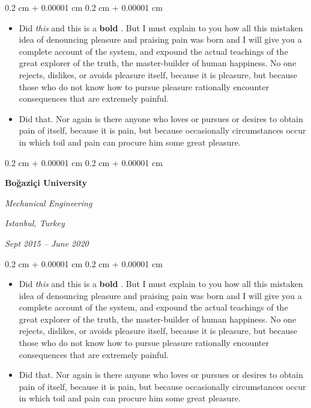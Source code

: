 \documentclass[10pt, letterpaper]{article}
\newenvironment{highlights}{
    \begin{itemize}[
        topsep=0.10 cm,
        parsep=0.10 cm,
        partopsep=0pt,
        itemsep=0pt,
        leftmargin=0.4 cm + 10pt
    ]
}{
    \end{itemize}
} %
\newenvironment{onecolentry}{
    \begin{adjustwidth}{
        0.2 cm + 0.00001 cm
    }{
        0.2 cm + 0.00001 cm
    }
}{
    \end{adjustwidth}
} %
\newenvironment{twocolentry}[2][]{
    \onecolentry
    \def\secondColumn{#2}
    \setcolumnwidth{\fill, 4.5 cm}
    \begin{paracol}{2}
}{
    \switchcolumn \raggedleft \secondColumn
    \end{paracol}
    \endonecolentry
} %
\let\hrefWithoutArrow\href
\renewcommand{\href}[2]{\hrefWithoutArrow{#1}{\ifthenelse{\equal{#2}{}}{ }{#2 }\raisebox{.15ex}{\footnotesize \faExternalLink*}}}
\begin{document}
        \vspace{0.10 cm}
        \begin{onecolentry}
            \begin{highlights}
                \item Did \textit{this} and this is a \textbf{bold} \href{https://example.com}{link}. But I must explain to you how all this mistaken idea of denouncing pleasure and praising pain was born and I will give you a complete account of the system, and expound the actual teachings of the great explorer of the truth, the master-builder of human happiness. No one rejects, dislikes, or avoids pleasure itself, because it is pleasure, but because those who do not know how to pursue pleasure rationally encounter consequences that are extremely painful.
                \item Did that. Nor again is there anyone who loves or pursues or desires to obtain pain of itself, because it is pain, but because occasionally circumstances occur in which toil and pain can procure him some great pleasure.
            \end{highlights}
        \end{onecolentry}


        \vspace{0.2 cm}

        \begin{twocolentry}{
        \textit{Istanbul, Turkey}    
            
        \textit{Sept 2015 – June 2020}}
            \textbf{Boğaziçi University}

            \textit{Mechanical Engineering}
        \end{twocolentry}

        \vspace{0.10 cm}
        \begin{onecolentry}
            \begin{highlights}
                \item Did \textit{this} and this is a \textbf{bold} \href{https://example.com}{link}. But I must explain to you how all this mistaken idea of denouncing pleasure and praising pain was born and I will give you a complete account of the system, and expound the actual teachings of the great explorer of the truth, the master-builder of human happiness. No one rejects, dislikes, or avoids pleasure itself, because it is pleasure, but because those who do not know how to pursue pleasure rationally encounter consequences that are extremely painful.
                \item Did that. Nor again is there anyone who loves or pursues or desires to obtain pain of itself, because it is pain, but because occasionally circumstances occur in which toil and pain can procure him some great pleasure.
            \end{highlights}
        \end{onecolentry}
\end{document}
